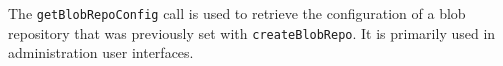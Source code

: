 The \verb+getBlobRepoConfig+ call is used to retrieve the configuration of a blob
repository that was previously set with \verb+createBlobRepo+. It is primarily used in
administration user interfaces.
